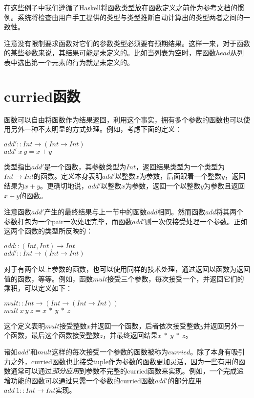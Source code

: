 在这些例子中我们遵循了Haskell将函数类型放在函数定义之前作为参考文档的惯例。系统将检查由用户手工提供的类型与类型推断自动计算出的类型两者之间的一致性。

注意没有限制要求函数对它们的参数类型必须要有预期结果。这样一来，对于函数的某些参数来说，其结果可能是未定义的。比如当列表为空时，库函数$head$从列表中选出第一个元素的行为就是未定义的。

\section{curried函数}
函数可以自由将函数作为结果返回，利用这个事实，拥有多个参数的函数也可以使用另外一种不太明显的方式处理。例如，考虑下面的定义：

\noindent\hspace*{1cm} $add' :: Int \rightarrow (Int \rightarrow Int)$\\
\hspace*{1cm} $add'~x~y = x + y$

类型指出$add'$是一个函数，其参数类型为$Int$，返回结果类型为一个类型为$Int
\rightarrow
Int$的函数。定义本身表明$add'$以整数$x$为参数，后面跟着一个整数$y$，返回结果为$x
+ y$。更确切地说，$add'$以整数$x$为参数，返回一个以整数$y$为参数且返回$x
+ y$的函数。

注意函数$add'$产生的最终结果与上一节中的函数$add$相同。然而函数$add$将其两个参数打包为一个pair一次处理完毕，而函数$add'$则一次仅接受处理一个参数。正如这两个函数的类型所反映的：

\noindent\hspace*{1cm} $add :: (Int, Int) \rightarrow Int$\\
\hspace*{1cm} $add' :: Int \rightarrow (Int \rightarrow Int)$

对于有两个以上参数的函数，也可以使用同样的技术处理，通过返回以函数为返回值的函数，等等。例如，函数$mult$接受三个参数，每次接受一个，并返回它们的乘积，可以定义如下：

\noindent\hspace*{1cm} $mult :: Int \rightarrow (Int \rightarrow (Int
\rightarrow Int))$\\
\hspace*{1cm} $mult~x~y~z = x~*~y~*~z$

这个定义表明$mult$接受整数$x$并返回一个函数，后者依次接受整数$y$并返回另外一个函数，最后这个函数接受整数$z$，并最终返回结果$x~*~y~*~z$。

诸如$add'$和$mult$这样的每次接受一个参数的函数被称为$curried$。除了本身有吸引力之外，curried函数也比接受tuple作为参数的函数更加灵活，因为一些有用的函数通常可以通过\textit{部分应用}到参数不完整的curried函数来实现。例如，一个完成递增功能的函数可以通过只需一个参数的curried函数$add'$的部分应用$add~1
:: Int \rightarrow Int$实现。

